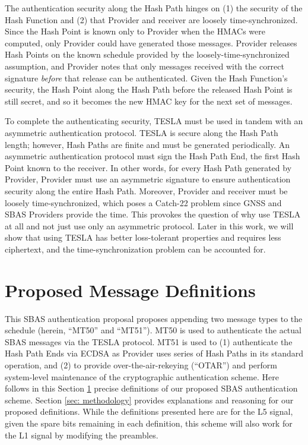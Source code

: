 \documentclass[letterpaper,times]{IONconf/IONconf}
\begin{document}
The authentication security along the Hash Path hinges on (1) the security of the Hash Function and (2) that Provider and receiver are loosely time-synchronized.
Since the Hash Point is known only to Provider when the HMACs were computed, only Provider could have generated those messages.
Provider releases Hash Points on the known schedule provided by the loosely-time-synchronized assumption, and Provider notes that only messages received with the correct signature {\em before} that release can be authenticated.
Given the Hash Function's security, the Hash Point along the Hash Path before the released Hash Point is still secret, and so it becomes the new HMAC key for the next set of messages.

To complete the authenticating security, TESLA must be used in tandem with an asymmetric authentication protocol.
TESLA is secure along the Hash Path length; however, Hash Paths are finite and must be generated periodically.
An asymmetric authentication protocol must sign the Hash Path End, the first Hash Point known to the receiver.
In other words, for every Hash Path generated by Provider, Provider must use an asymmetric signature to ensure authentication security along the entire Hash Path.
Moreover, Provider and receiver must be loosely time-synchronized, which poses a Catch-22 problem since GNSS and SBAS Providers provide the time.
This provokes the question of why use TESLA at all and not just use only an asymmetric protocol.
Later in this work, we will show that using TESLA has better loss-tolerant properties and requires less ciphertext, and the time-synchronization problem can be accounted for.

\section{Proposed Message Definitions} \label{sec: definitions}

This SBAS authentication proposal proposes appending two message types to the schedule (herein, ``MT50'' and ``MT51'').
MT50 is used to authenticate the actual SBAS messages via the TESLA protocol.
MT51 is used to (1) authenticate the Hash Path Ends via ECDSA as Provider uses series of Hash Paths in its standard operation, and (2) to provide over-the-air-rekeying (``OTAR'') and perform system-level maintenance of the cryptographic authentication scheme.
Here follows in this Section \ref{sec: definitions} precise definitions of our proposed SBAS authentication scheme.
Section \ref{sec: methodology} provides explanations and reasoning for our proposed definitions.
While the definitions presented here are for the L5 signal, given the spare bits remaining in each definition, this scheme will also work for the L1 signal by modifying the preambles.
\end{document}
